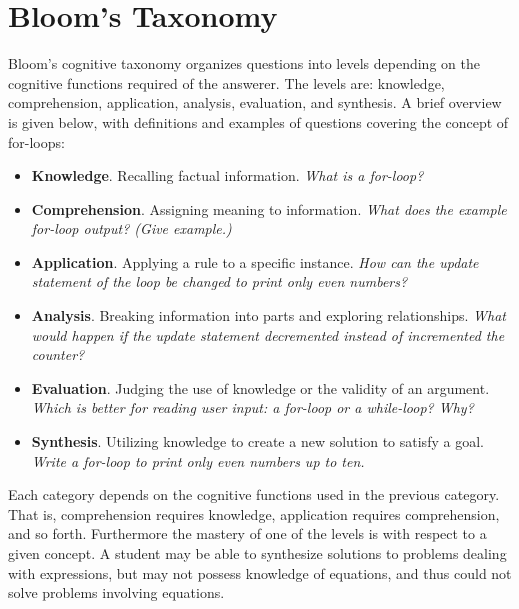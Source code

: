 
\section{Bloom's Taxonomy}

Bloom's cognitive taxonomy organizes questions into levels depending on the
cognitive functions required of the answerer.  The levels are: knowledge,
comprehension, application, analysis, evaluation, and synthesis.  A brief
overview is given below, with definitions and examples of questions covering
the concept of for-loops:

\begin{itemize}

\item \textbf{Knowledge}. Recalling factual information.  \emph{What is a
for-loop?}

\item \textbf{Comprehension}. Assigning meaning to information.  \emph{What
does the example for-loop output? (Give example.)}

\item \textbf{Application}. Applying a rule to a specific instance.  \emph{How
can the update statement of the loop be changed to print only even numbers?}

\item \textbf{Analysis}. Breaking information into parts and exploring
relationships.  \emph{What would happen if the update statement decremented
instead of incremented the counter?}

\item \textbf{Evaluation}. Judging the use of knowledge or the validity of an
argument.  \emph{Which is better for reading user input: a for-loop or a
while-loop? Why?}

\item \textbf{Synthesis}. Utilizing knowledge to create a new solution to
satisfy a goal.  \emph{Write a for-loop to print only even numbers up to ten.}

\end{itemize}

Each category depends on the cognitive functions used in the previous category.
That is, comprehension requires knowledge, application requires comprehension,
and so forth.  Furthermore the mastery of one of the levels is with respect to
a given concept.  A student may be able to synthesize solutions to problems
dealing with expressions, but may not possess knowledge of equations, and thus
could not solve problems involving equations.

